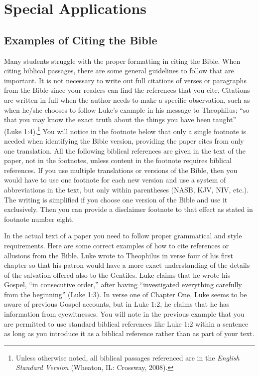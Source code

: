 \documentclass[raggedright]{turabian-researchpaper}
\begin{document}
\section{Special Applications}

\subsection{Examples of Citing the Bible}

Many students struggle with the proper formatting in citing the Bible. When
citing biblical passages, there are some general guidelines to follow that are
important. It is not necessary to write out full citations of verses or
paragraphs from the Bible since your readers can find the references that you
cite. Citations are written in full when the author needs to make a specific
observation, such as when he/she chooses to follow Luke's example in his message
to Theophilus; ``so that you may know the exact truth about the things you have
been taught'' (Luke 1:4).\footnote{Unless otherwise noted, all biblical passages
referenced are in the \textit{English Standard Version} (Wheaton, IL: Crossway,
2008).} You will notice in the footnote below that only a single footnote is
needed when identifying the Bible version, providing the paper cites from only
one translation. All the following biblical references are given in the text of
the paper, not in the footnotes, unless content in the footnote requires
biblical references. If you use multiple translations or versions of the Bible,
then you would have to use one footnote for each new version and use a system of
abbreviations in the text, but only within parentheses (NASB, KJV, NIV, etc.).
The writing is simplified if you choose one version of the Bible and use it
exclusively. Then you can provide a disclaimer footnote to that effect as stated
in footnote number eight.

In the actual text of a paper you need to follow proper grammatical and style
requirements. Here are some correct examples of how to cite references or
allusions from the Bible. Luke wrote to Theophilus in verse four of his first
chapter so that his patron would have a more exact understanding of the details
of the salvation offered also to the Gentiles. Luke claims that he wrote his
Gospel, ``in consecutive order,'' after having ``investigated everything
carefully from the beginning'' (Luke 1:3). In verse one of Chapter One, Luke
seems to be aware of previous Gospel accounts, but in Luke 1:2, he claims that
he has information from eyewitnesses. You will note in the previous example that
you are permitted to use standard biblical references like Luke 1:2 within a
sentence as long as you introduce it as a biblical reference rather than as part
of your text.
\end{document}
